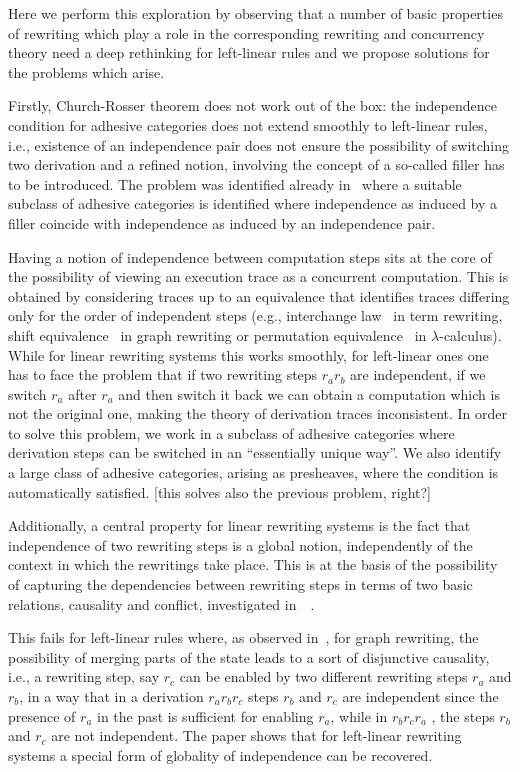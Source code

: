 \documentclass[a4paper]{article}
\theoremstyle{definition}
\begin{document}
Here we perform this exploration by observing that a number of basic
properties of rewriting which play a role in the corresponding
rewriting and concurrency theory need a deep rethinking for
left-linear rules and we propose solutions for the problems which
arise.

Firstly, Church-Rosser theorem does not work out of the box: the
independence condition for adhesive categories does not extend
smoothly to left-linear rules, i.e., existence of an independence pair
does not ensure the possibility of switching two derivation and a
refined notion, involving the concept of a so-called filler has to be
introduced. The problem was identified already
in~\cite{baldan2011adhesivity} where a suitable subclass of adhesive
categories is identified where independence as induced by a filler
coincide with independence as induced by an independence pair.

Having a notion of independence between computation steps sits at the core of the possibility of viewing an execution trace as a concurrent computation. This is obtained by considering traces up to an equivalence that identifies traces differing only for the order of independent steps (e.g., interchange law~\cite{Mes92} in term rewriting, shift
equivalence~\cite{CMREHL:AAGT} in graph rewriting or permutation
equivalence~\cite{JJL80} in $\lambda$-calculus). While for linear rewriting systems this works smoothly, for left-linear ones one has to face the problem that if two rewriting steps $r_a r_b$ are independent, if we switch $r_a$ after $r_a$ and then switch it back we can obtain a computation which is not the original one, making the theory of derivation traces inconsistent. In order to solve this problem, we work in a subclass of adhesive categories where derivation steps can be switched in an ``essentially unique way''. We also identify a large class of adhesive categories, arising as presheaves, where the condition is automatically satisfied. [this solves also the previous problem, right?]


Additionally, a central property for linear rewriting systems is the fact that independence of two rewriting steps is a global notion, independently of the context in which the rewritings take place. This is at the basis of the possibility of capturing the dependencies between rewriting steps in terms of two basic relations, causality and conflict, investigated in~~\cite{Handbook,Bal:PhD,Sch:RRSG}.

This fails for left-linear rules where, as observed
in~\cite{baldan2017domains}, for graph rewriting, the possibility of
merging parts of the state leads to a sort of disjunctive causality,
i.e., a rewriting step, say $r_c$ can be enabled by two different
rewriting steps $r_a$ and $r_b$, in a way that in a derivation
$r_a r_b r_c$ steps $r_b$ and $r_c$ are independent since the presence
of $r_a$ in the past is sufficient for enabling $r_a$, while in
$r_b r_c r_a$ , the steps $r_b$ and $r_c$ are not independent. The
paper shows that for left-linear rewriting systems a special form of
globality of independence can be recovered.
\end{document}
